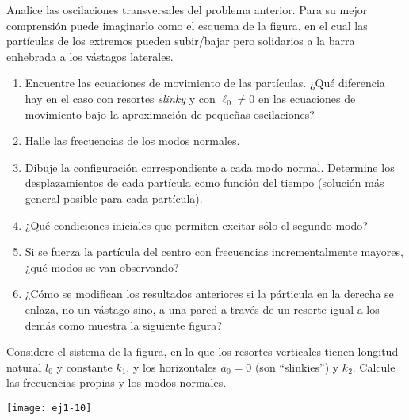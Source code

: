 \item
Analice las oscilaciones transversales del problema anterior.
Para su mejor comprensión puede imaginarlo como el esquema de la figura, en el cual las partículas de los extremos pueden subir/bajar pero solidarios a la barra enhebrada a los vástagos laterales. 
\begin{figure}[h]
	\centering
	
\end{figure} 
\begin{enumerate}
	\item Encuentre las ecuaciones de movimiento de las partículas.
	¿Qué diferencia hay en el caso con resortes \emph{slinky} y con $\ell_0 \neq 0$ en las ecuaciones de movimiento bajo la aproximación de pequeñas oscilaciones? 
	\item Halle las frecuencias de los modos normales.
	\item Dibuje la configuración correspondiente a cada modo normal.
Determine los desplazamientos de cada partícula como función del tiempo (solución más general posible para cada partícula).
	\item ¿Qué condiciones iniciales que permiten excitar sólo el segundo modo?
	\item Si se fuerza la partícula del centro con frecuencias incrementalmente mayores, ¿qué modos se van observando?
	\item ¿Cómo se modifican los resultados anteriores si la párticula en la derecha se enlaza, no un vástago sino, a una pared a través de un resorte igual a los demás como muestra la siguiente figura?
	\begin{figure}[h]
		\centering
		
	\end{figure} 
\end{enumerate}



\item
\begin{minipage}[t][1.2cm]{0.6\textwidth}
Considere el sistema de la figura, en la que los resortes verticales tienen longitud natural $l_0$ y constante $k_1$, y los horizontales $a_0= 0$ (son ``slinkies'') y $k_2$.
Calcule las frecuencias propias y los modos normales. 
\end{minipage}
\begin{minipage}[c][1.2cm][t]{0.35\textwidth}
  \texttt{[image: ej1-10]}
\end{minipage}
